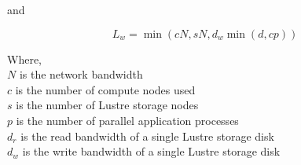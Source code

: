 \documentclass[10pt,journal,compsoc]{IEEEtran}
\begin{document}
    and


    \begin{equation}%
        L_{w} = \min{(cN, sN, d_{w}\min{(d, cp)})}
    \end{equation}

    {\noindent}
    Where, \\
    $N$ is the network bandwidth \\
    $c$ is the number of compute nodes used \\
    $s$ is the number of Lustre storage nodes \\
    $p$ is the number of parallel application processes \\
    $d_{r}$ is the read bandwidth of a single Lustre storage disk \\
    $d_{w}$ is the write bandwidth of a single Lustre storage disk \\





\end{document}
